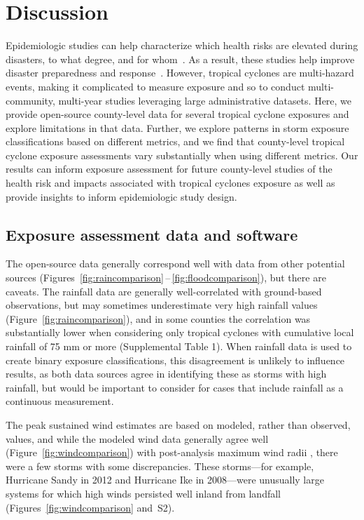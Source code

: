 \section*{Discussion}

Epidemiologic studies can help characterize which health risks are elevated
during disasters, to what degree, and for
whom~\parencite{ibrahim2005unfortunate, noji2005disasters}.  As a result, these
studies help improve disaster preparedness and
response~\parencite{noji2005disasters}.  However, tropical cyclones are
multi-hazard events, making it complicated to measure exposure and so to
conduct multi-community, multi-year studies leveraging large administrative
datasets.  Here, we provide open-source county-level data for several tropical
cyclone exposures and explore limitations in that data.  
Further, we explore patterns in storm exposure classifications based on
different metrics, and we find that county-level tropical cyclone exposure
assessments vary substantially when using different metrics.
Our results can inform exposure assessment for future county-level studies of
the health risk and impacts associated with tropical cyclones exposure as
well as provide insights to inform epidemiologic study design.  

\subsection*{Exposure assessment data and software}

The open-source data generally correspond well with data from other potential
sources (Figures~\ref{fig:raincomparison}\,--\,\ref{fig:floodcomparison}), but
there are caveats. The rainfall data are generally well-correlated with
ground-based observations, but may sometimes underestimate very high rainfall
values (Figure~\ref{fig:raincomparison}), and in some counties the correlation
was substantially lower when considering only tropical cyclones with cumulative
local rainfall of 75 mm or more (Supplemental Table 1). When rainfall data is
used to create binary exposure classifications, this disagreement is unlikely
to influence results, as both data sources agree in identifying these as storms
with high rainfall, but would be important to consider for cases that include
rainfall as a continuous measurement. 

The peak sustained wind estimates are based on modeled, rather than observed,
values, and while the modeled wind data generally agree well
(Figure~\ref{fig:windcomparison}) with post-analysis maximum wind radii
\parencite{landsea2013}, there were a few storms with some discrepancies. These
storms---for example, Hurricane Sandy in 2012 and Hurricane Ike in 2008---were
unusually large systems for which high winds persisted well inland from
landfall (Figures~\ref{fig:windcomparison} and~S2). 

